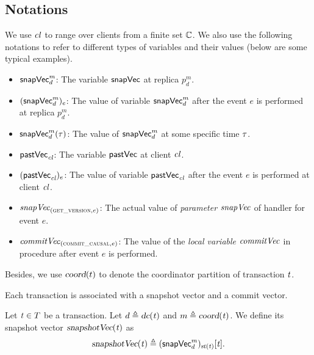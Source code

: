 
\subsection{Notations} \label{ss:proof-notations}

We use $\mathit{cl}$ to range over clients from a finite set $\mathbb{C}$.
We also use the following notations
to refer to different types of variables and their values
(below are some typical examples).
\begin{itemize}
  \item ${\sf snapVec}^{m}_{d}$:
    The variable ${\sf snapVec}$ at replica $p^{m}_{d}$.
  \item $({\sf snapVec}^{m}_{d})_{e}$:
    The value of variable ${\sf snapVec}^{m}_{d}$
    after the event $e$ is performed at replica $p^{m}_{d}$.
  \item ${\sf snapVec}^{m}_{d}(\tau)$:
    The value of ${\sf snapVec}^{m}_{d}$ at some specific time $\tau$.
  \item ${\sf pastVec}_{\mathit{cl}}$: The variable ${\sf pastVec}$ at client $\mathit{cl}$.
  \item $({\sf pastVec}_{\mathit{cl}})_{e}$:
    The value of variable ${\sf pastVec}_{\mathit{cl}}$
    after the event $e$ is performed at client $\mathit{cl}$.
  \item $\mathit{snapVec}_{(\textsc{get\_version}, e)}$:
    The actual value of \emph{parameter} $\mathit{snapVec}$ of handler \readkey{}
    for event $e$.
  \item $\mathit{commitVec}_{(\textsc{commit\_causal}, e)}$:
    The value of the \emph{local variable} $\mathit{commitVec}$
    in procedure \commitcausal{}
    after event $e$ is performed.
\end{itemize}
Besides, we use $\textsl{coord}(t)$ to denote the coordinator partition
of transaction $\mathit{t}$.

Each transaction is associated with a snapshot vector and a commit vector.

\begin{appdefinition} \label{def:snapshotvc}
  Let $\mathit{t} \in T$ be a transaction.
  Let $d \triangleq \textsl{dc}(\mathit{t})$ and $m \triangleq \textsl{coord}(\mathit{t})$.
  We define its snapshot vector $\textsl{snapshotVec}(\mathit{t})$ as
  \[
    \textsl{snapshotVec}(\mathit{t}) \triangleq ({\sf snapVec}^{m}_{d})_{\textsl{st}(\mathit{t})}[\mathit{t}].
  \]
\end{appdefinition}

